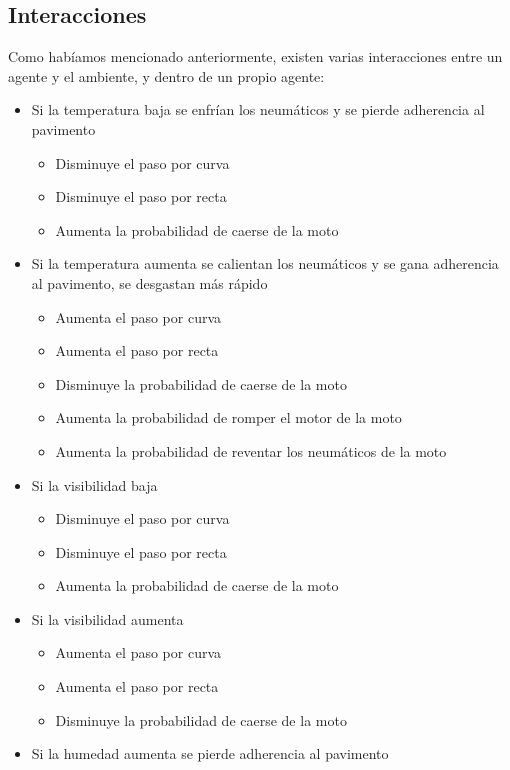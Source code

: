 \documentclass[12pt, letterpaper,spanish]{article}
\theoremstyle{definition}
\theoremstyle{remark}
\begin{document}
	\subsection{Interacciones}
	Como habíamos mencionado anteriormente, existen varias interacciones entre un agente y el ambiente, y dentro de un propio agente:
	\begin{itemize}
		\item Si la temperatura baja se enfrían los neumáticos y se pierde adherencia al pavimento
		\begin{itemize}
			\item Disminuye el paso por curva
			\item Disminuye el paso por recta
			\item Aumenta la probabilidad de caerse de la moto
		\end{itemize} 
		\item Si la temperatura aumenta se calientan los neumáticos y se gana adherencia al pavimento, se desgastan más rápido
		\begin{itemize}
			\item Aumenta el paso por curva
			\item Aumenta el paso por recta
			\item Disminuye la probabilidad de caerse de la moto
			\item Aumenta la probabilidad de romper el motor de la moto
			\item Aumenta la probabilidad de reventar los neumáticos de la moto
		\end{itemize}
		\item Si la visibilidad baja
		\begin{itemize}
			\item Disminuye el paso por curva
			\item Disminuye el paso por recta
			\item Aumenta la probabilidad de caerse de la moto
		\end{itemize}
		\item Si la visibilidad aumenta
		\begin{itemize}
			\item Aumenta el paso por curva
			\item Aumenta el paso por recta
			\item Disminuye la probabilidad de caerse de la moto
		\end{itemize}
		\item Si la humedad aumenta se pierde adherencia al pavimento
		\begin{itemize}

\end{itemize}
\end{itemize}
\end{document}
